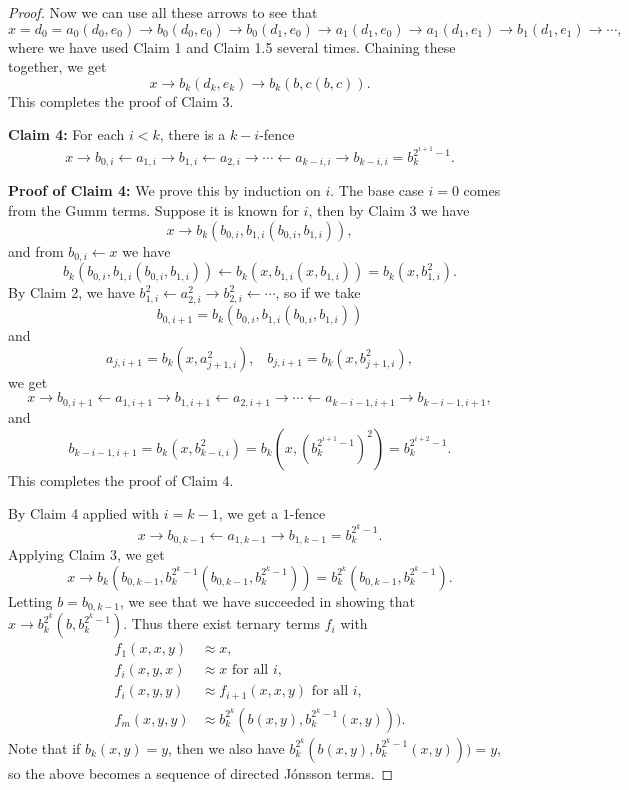 \begin{appendices}
\begin{proof}
Now we can use all these arrows to see that
\[
x = d_0 = a_0(d_0,e_0) \rightarrow b_0(d_0,e_0) \rightarrow b_0(d_1,e_0) \rightarrow a_1(d_1,e_0) \rightarrow a_1(d_1,e_1) \rightarrow b_1(d_1,e_1) \rightarrow \cdots,
\]
where we have used Claim 1 and Claim 1.5 several times. Chaining these together, we get
\[
x \rightarrow b_k(d_k,e_k) \rightarrow b_k(b,c(b,c)).%
\]
This completes the proof of Claim 3.

{\bf Claim 4:} For each $i < k$, there is a $k-i$-fence
\[
x \rightarrow b_{0,i} \leftarrow a_{1,i} \rightarrow b_{1,i} \leftarrow a_{2,i} \rightarrow \cdots \leftarrow a_{k-i,i} \rightarrow b_{k-i,i} = b_k^{2^{i+1}-1}.
\]

{\bf Proof of Claim 4:} We prove this by induction on $i$. The base case $i=0$ comes from the Gumm terms. Suppose it is known for $i$, then by Claim 3 we have
\[
x \rightarrow b_k(b_{0,i},b_{1,i}(b_{0,i},b_{1,i})),
\]
and from $b_{0,i} \leftarrow x$ we have
\[
b_k(b_{0,i},b_{1,i}(b_{0,i},b_{1,i})) \leftarrow b_k(x,b_{1,i}(x,b_{1,i})) = b_k(x,b_{1,i}^2).
\]
By Claim 2, we have $b_{1,i}^2 \leftarrow a_{2,i}^2 \rightarrow b_{2,i}^2 \leftarrow \cdots$, so if we take
\[
b_{0,i+1} = b_k(b_{0,i},b_{1,i}(b_{0,i},b_{1,i}))
\]
and
\[
a_{j,i+1} = b_k(x,a_{j+1,i}^2), \;\;\; b_{j,i+1} = b_k(x,b_{j+1,i}^2),
\]
we get
\[
x \rightarrow b_{0,i+1} \leftarrow a_{1,i+1} \rightarrow b_{1,i+1} \leftarrow a_{2,i+1} \rightarrow \cdots \leftarrow a_{k-i-1,i+1} \rightarrow b_{k-i-1,i+1},
\]
and
\[
b_{k-i-1,i+1} = b_k(x,b_{k-i,i}^2) = b_k(x,(b_k^{2^{i+1}-1})^2) = b_k^{2^{i+2}-1}.
\]
This completes the proof of Claim 4.

By Claim 4 applied with $i = k-1$, we get a $1$-fence
\[
x \rightarrow b_{0,k-1} \leftarrow a_{1,k-1} \rightarrow b_{1,k-1} = b_k^{2^k-1}.
\]
Applying Claim 3, we get
\[
x \rightarrow b_k(b_{0,k-1},b_k^{2^k-1}(b_{0,k-1},b_k^{2^k-1})) = b_k^{2^k}(b_{0,k-1},b_k^{2^k-1}).
\]
Letting $b = b_{0,k-1}$, we see that we have succeeded in showing that $x \rightarrow b_k^{2^k}(b,b_k^{2^k-1})$. Thus there exist ternary terms $f_i$ with
\begin{align*}
f_1(x,x,y) &\approx x,\\
f_i(x,y,x) &\approx x\text{ for all }i,\\
f_i(x,y,y) &\approx f_{i+1}(x,x,y)\text{ for all }i,\\
f_m(x,y,y) &\approx b_k^{2^k}(b(x,y),b_k^{2^k-1}(x,y))).
\end{align*}
Note that if $b_k(x,y) = y$, then we also have $b_k^{2^k}(b(x,y),b_k^{2^k-1}(x,y))) = y$, so the above becomes a sequence of directed J\'onsson terms.


\end{proof}
\end{appendices}
